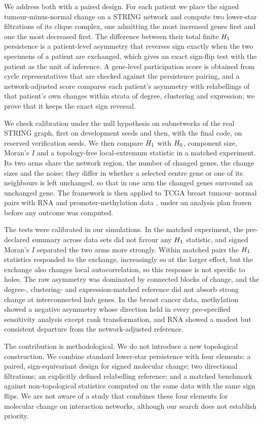 We address both with a paired design. For each patient we place the signed tumour-minus-normal change on a STRING network and compute two lower-star filtrations of its clique complex, one admitting the most increased genes first and one the most decreased first. The difference between their total finite $H_{1}$ persistence is a patient-level asymmetry that reverses sign exactly when the two specimens of a patient are exchanged, which gives an exact sign-flip test with the patient as the unit of inference. A gene-level participation score is obtained from cycle representatives that are checked against the persistence pairing, and a network-adjusted score compares each patient's asymmetry with relabellings of that patient's own changes within strata of degree, clustering and expression; we prove that it keeps the exact sign reversal.

We check calibration under the null hypothesis on subnetworks of the real STRING graph, first on development seeds and then, with the final code, on reserved verification seeds. We then compare $H_{1}$ with $H_{0}$, component size, Moran's $I$ and a topology-free local-extremum statistic in a matched experiment. Its two arms share the network region, the number of changed genes, the change sizes and the noise; they differ in whether a selected centre gene or one of its neighbours is left unchanged, so that in one arm the changed genes surround an unchanged gene. The framework is then applied to \cohortN{} TCGA breast tumour--normal pairs with RNA and promoter-methylation data \citep{tcga2012}, under an analysis plan frozen before any outcome was computed.

The tests were calibrated in our simulations. In the matched experiment, the pre-declared summary across data sets did not favour any $H_{1}$ statistic, and signed Moran's $I$ separated the two arms more strongly. Within matched pairs the $H_{1}$ statistics responded to the exchange, increasingly so at the larger effect, but the exchange also changes local autocorrelation, so this response is not specific to holes. The raw asymmetry was dominated by connected blocks of change, and the degree-, clustering- and expression-matched reference did not absorb strong change at interconnected hub genes. In the breast cancer data, methylation showed a negative asymmetry whose direction held in every pre-specified sensitivity analysis except rank transformation, and RNA showed a modest but consistent departure from the network-adjusted reference.

The contribution is methodological. We do not introduce a new topological construction. We combine standard lower-star persistence \citep{edelsbrunner2002,cohensteiner2007} with four elements: a paired, sign-equivariant design for signed molecular change; two directional filtrations; an explicitly defined relabelling reference; and a matched benchmark against non-topological statistics computed on the same data with the same sign flips. We are not aware of a study that combines these four elements for molecular change on interaction networks, although our search does not establish priority.
